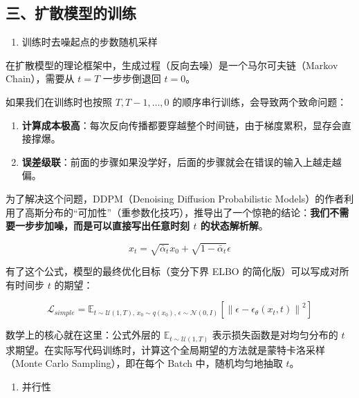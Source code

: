 \hypertarget{ux4e09ux6269ux6563ux6a21ux578bux7684ux8badux7ec3}{%
\subsection{三、扩散模型的训练}\label{ux4e09ux6269ux6563ux6a21ux578bux7684ux8badux7ec3}}

\begin{enumerate}
\def\labelenumi{\arabic{enumi}.}
\tightlist
\item
  训练时去噪起点的步数随机采样
\end{enumerate}

在扩散模型的理论框架中，生成过程（反向去噪）是一个马尔可夫链（Markov Chain），需要从 \(t=T\) 一步步倒退回 \(t=0\)。

如果我们在训练时也按照 \(T,T-1,\ldots,0\) 的顺序串行训练，会导致两个致命问题：

\begin{enumerate}
\def\labelenumi{\arabic{enumi}.}
\tightlist
\item
  \textbf{计算成本极高}：每次反向传播都要穿越整个时间链，由于梯度累积，显存会直接撑爆。
\item
  \textbf{误差级联}：前面的步骤如果没学好，后面的步骤就会在错误的输入上越走越偏。
\end{enumerate}

为了解决这个问题，DDPM（Denoising Diffusion Probabilistic Models）的作者利用了高斯分布的``可加性''（重参数化技巧），推导出了一个惊艳的结论：\textbf{我们不需要一步步加噪，而是可以直接写出任意时刻 \(t\) 的状态解析解}。

\[
x_t=\sqrt{\bar{\alpha}_t}x_0+\sqrt{1-\bar{\alpha}_t}\epsilon
\]

有了这个公式，模型的最终优化目标（变分下界 ELBO 的简化版）可以写成对所有时间步 \(t\) 的期望：

\[
\mathcal{L}_{simple}
=\mathbb{E}_{t\sim\mathcal{U}(1,T),\,x_0\sim q(x_0),\,\epsilon\sim\mathcal{N}(0,I)}
\left[\left\|\epsilon-\epsilon_\theta(x_t,t)\right\|^2\right]
\]

数学上的核心就在这里：公式外层的 \(\mathbb{E}_{t\sim\mathcal{U}(1,T)}\) 表示损失函数是对均匀分布的 \(t\) 求期望。在实际写代码训练时，计算这个全局期望的方法就是蒙特卡洛采样（Monte Carlo Sampling），即在每个 Batch 中，随机均匀地抽取 \(t\)。

\begin{enumerate}
\def\labelenumi{\arabic{enumi}.}
\setcounter{enumi}{1}
\tightlist
\item
  并行性
\end{enumerate}

